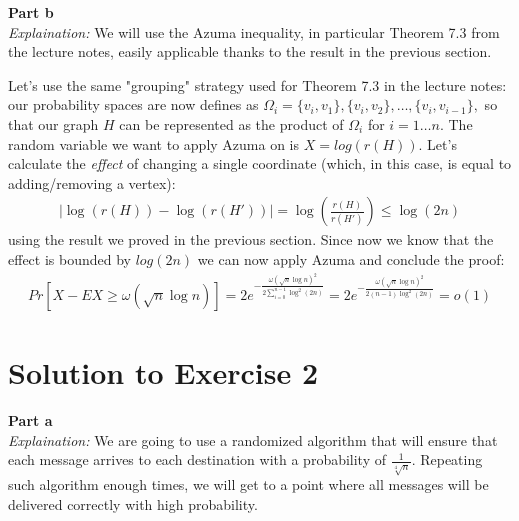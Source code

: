 \documentclass[a4paper,german]{article}
\begin{document}






\vspace{1em}
\noindent 
\textbf{Part b} \\
\emph{Explaination:} We will use the Azuma inequality, in particular Theorem 7.3 from the lecture notes, 
easily applicable thanks to the result in the previous section.

\vspace{1em}

Let's use the same "grouping" strategy used for Theorem 7.3 in the lecture
notes: our probability spaces are now defines as $\Omega_i = \{v_i, v_1\},
\{v_i, v_2\}, \ldots , \{v_i, v_{i-1}\},$ so that our graph $H$ can be
represented as the product of $\Omega_i$ for $i = 1 \ldots n$. The random
variable we want to apply Azuma on is $X = log(r(H))$. Let's calculate the
\emph{effect} of changing a single coordinate (which, in this case, is equal to
adding/removing a vertex):
\begin{align*}
	| \log(r(H)) - \log(r(H')) | = \log( \frac{r(H)}{r(H')}) \leq \log(2n)
\end{align*}
using the result we proved in the previous section. Since now we know that the effect is bounded by
$log(2n)$ we can now apply Azuma and conclude the proof:
\begin{align*}
	Pr[X - EX \geq \omega(\sqrt{n} \log n)] = 2e^{- \frac{\omega(\sqrt{n} \log n)^2}{2\sum_{i=0}^{n-1} \log^2 (2n)} } = 2e^{- \frac{\omega(\sqrt{n} \log n)^2}{2(n-1) \log^2 (2n)}} = o(1)
\end{align*}



\section*{Solution to Exercise 2}
\textbf{Part a} \\
\emph{Explaination:} We are going to use a randomized algorithm that will ensure that each message
arrives to each destination with a probability of $ \frac{1}{\sqrt[4]{n}}$. Repeating such algorithm
enough times, we will get to a point where all messages will be delivered correctly with high probability.
\end{document}
